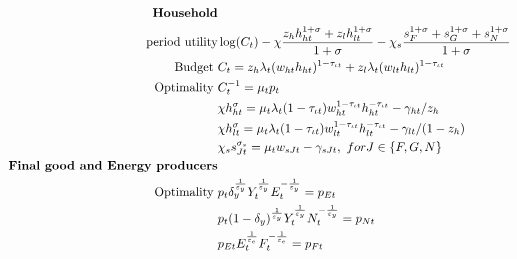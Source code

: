 \begin{align}
\text{\textbf{Household}}&\nonumber\\ \text{period utility}\vspace{4mm}&  \log(C_t)-\chi\frac{z_hh_{ht}^{1+\sigma}+z_lh_{lt}^{1+\sigma}}{1+\sigma}-\chi_s\frac{s_F^{1+\sigma}+s_G^{1+\sigma}+s_N^{1+\sigma}}{{1+\sigma}} \nonumber %
\\
\text{Budget}\ \vspace{4mm}& C_t=z_h \lambda_t (w_{ht}h_{ht})^{1-\tau_{\iota t}}+z_l \lambda_t (w_{lt}h_{lt})^{1-\tau_{\iota t}}\nonumber\\ %
\text{Optimality}\ \vspace{4mm}
& C_t^{-1}= \mu_tp_{t}\nonumber\\
& \chi h_{ht}^{\sigma}=\mu_t \lambda_t(1-\tau_{\iota t})w_{ht}^{1-\tau_{\iota t}}h_{ht}^{-\tau_{\iota t}}-\gamma_{ht}/z_h\nonumber\\
& \chi h_{lt}^{\sigma}=\mu_t \lambda_t(1-\tau_{\iota t})w_{lt}^{1-\tau_{\iota t}}h_{lt}^{-\tau_{\iota t}}-\gamma_{lt}/(1-z_h)\nonumber\\
& \chi_s s_{Jt}^{\sigma_s} =\mu_t w_{sJt}-\gamma_{sJt},\ for  J\in\{F,G,N\} \nonumber\\ %
\text{\textbf{Final good and Energy producers}}&\nonumber\\
\text{Optimality}\ \vspace{4mm}&
 p_{t}\delta_y^\frac{1}{\varepsilon_y}Y_t^\frac{1}{\varepsilon_y}E_t^{-\frac{1}{\varepsilon_y}}=p_{Et}\nonumber\\
& p_{t}(1-\delta_y)^\frac{1}{\varepsilon_y}Y_t^\frac{1}{\varepsilon_y}N_t^{-\frac{1}{\varepsilon_y}}=p_{Nt}\nonumber\\
&
p_{Et}E_t^\frac{1}{\varepsilon_e}{F}_t^{-\frac{1}{\varepsilon_e}}=p_{{F}t}\nonumber\\

\end{align}
